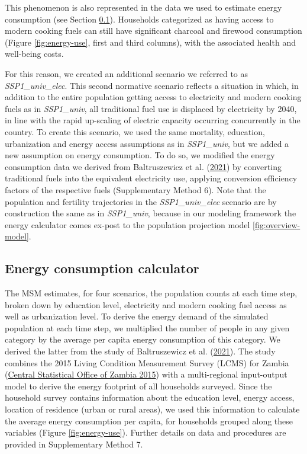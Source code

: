 \documentclass[
]{article}
\begin{document}
This phenomenon is also represented in the data we used to estimate energy consumption (see Section \ref{energyuse}). Households categorized as having access to modern cooking fuels can still have significant charcoal and firewood consumption (Figure \ref{fig:energy-use}, first and third columns), with the associated health and well-being costs.

For this reason, we created an additional scenario we referred to as \emph{SSP1\_univ\_elec}. This second normative scenario reflects a situation in which, in addition to the entire population getting access to electricity and modern cooking fuels as in \emph{SSP1\_univ}, all traditional fuel use is displaced by electricity by 2040, in line with the rapid up-scaling of electric capacity occurring concurrently in the country. To create this scenario, we used the same mortality, education, urbanization and energy access assumptions as in \emph{SSP1\_univ}, but we added a new assumption on energy consumption. To do so, we modified the energy consumption data we derived from Baltruszewicz et al. (\protect\hyperlink{ref-baltruszewicz_final_2021}{2021}) by converting traditional fuels into the equivalent electricity use, applying conversion efficiency factors of the respective fuels (Supplementary Method 6). Note that the population and fertility trajectories in the \emph{SSP1\_univ\_elec} scenario are by construction the same as in \emph{SSP1\_univ}, because in our modeling framework the energy calculator comes ex-post to the population projection model \ref{fig:overview-model}.

\newpage

\hypertarget{energyuse}{%
\subsection{Energy consumption calculator}\label{energyuse}}

The MSM estimates, for four scenarios, the population counts at each time step, broken down by education level, electricity and modern cooking fuel access as well as urbanization level. To derive the energy demand of the simulated population at each time step, we multiplied the number of people in any given category by the average per capita energy consumption of this category. We derived the latter from the study of Baltruszewicz et al. (\protect\hyperlink{ref-baltruszewicz_final_2021}{2021}). The study combines the 2015 Living Condition Measurement Survey (LCMS) for Zambia (\protect\hyperlink{ref-central_statistical_office_of_zambia_world_2015}{Central Statistical Office of Zambia 2015}) with a multi-regional input-output model to derive the energy footprint of all households surveyed. Since the household survey contains information about the education level, energy access, location of residence (urban or rural areas), we used this information to calculate the average energy consumption per capita, for households grouped along these variables (Figure \ref{fig:energy-use}). Further details on data and procedures are provided in Supplementary Method 7.
\end{document}
